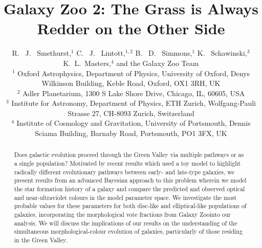 \documentclass{mn2e}
\begin{document}
\title[The Star Fomation History of the Green Valley]{Galaxy Zoo 2: The Grass is Always Redder on the Other Side}
\author[Smethurst et al. 2014]{R. ~J. ~Smethurst,$^1$ C. ~J. ~Lintott,$^{1,2}$ B. ~D. ~Simmons,$^{1}$ K. ~Schawinski,$^{3}$ \newauthor K.~L.~Masters,$^{4}$ and the Galaxy Zoo Team
\\ $^1$ Oxford Astrophysics, Department of Physics, University of Oxford, Denys Wilkinson Building, Keble Road, Oxford, OX1 3RH, UK 
\\ $^2$ Adler Planetarium, 1300 S Lake Shore Drive, Chicago, IL, 60605, USA 
\\ $^3$ Institute for Astronomy, Department of Physics, ETH Zurich, Wolfgang-Pauli Strasse 27, CH-8093 Zurich, Switzerland 
\\ $^4$ Institute of Cosmology and Gravitation, University of Portsmouth, Dennis Sciama Building, Barnaby Road, Portsmouth, PO1 3FX, UK }

\maketitle

\begin{abstract}
Does galactic evolution proceed through the Green Valley via multiple pathways or as a single population? Motivated by recent results which used a toy model to highlight radically different evolutionary pathways between early- and late-type galaxies, we present results from an advanced Bayesian approach to this problem wherein we model the star formation history of a galaxy and compare the predicted and observed optical and near-ultraviolet colours in the model parameter space. We investigate the most probable values for these parameters for both disc-like and elliptical-like populations of galaxies, incorporating the morphological vote fractions from Galaxy Zoo\footnotemark[1] into our analysis. We will discuss the implications of our results on the understanding of the simultaneous morphological-colour evolution of galaxies, particularly of those residing in the Green Valley. 
\end{abstract}

\\
\end{document}

